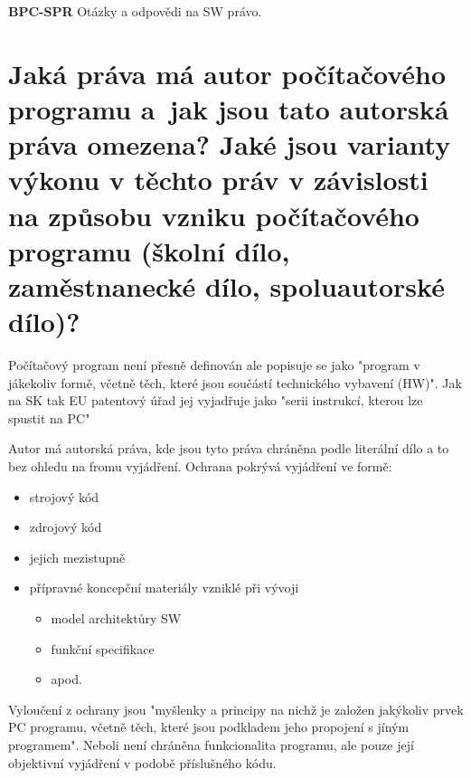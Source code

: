 \documentclass[12pt,a4paper,czech]{article}
\let\LaTeXStandardTableOfContents\tableofcontents
\renewcommand{\tableofcontents}{%
\begingroup%
\renewcommand{\bfseries}{\relax}%
\LaTeXStandardTableOfContents%
\endgroup%
}%
\newcommand{\nadpis}[1]{{\section{#1}}}
\newcommand{\nadpisM}[1]{\noindent\textbf{\Huge{#1}}\normalsize}
\begin{document}
\clearpage
\vspace*{\fill}
\begin{center}
\begin{minipage}{.6\textwidth}
\begin{center}
\vspace{0.5cm} \nadpisM{BPC-SPR}\newline
\newline
Otázky a odpovědi na SW právo.
\end{center}
\end{minipage}
\end{center}
\vfill %
\clearpage



\newpage
\tableofcontents
\newpage

\vspace{0.5cm} 
\nadpis{Jaká práva má autor počítačového programu a~jak jsou tato autorská práva omezena? Jaké jsou varianty výkonu v těchto práv v závislosti na způsobu vzniku počítačového programu (školní dílo, zaměstnanecké dílo, spoluautorské dílo)?}
Počítačový program není přesně definován ale popisuje se jako "program v jákekoliv formě, včetně těch, které jsou součástí technického vybavení (HW)". Jak na SK tak EU patentový úřad jej vyjadřuje jako "serii instrukcí, kterou lze spustit na PC"

Autor má autorská práva, kde jsou tyto práva chráněna podle literální dílo a to bez ohledu na fromu vyjádření.
\newline
\newline
Ochrana pokrývá vyjádření ve formě:
\begin{itemize}
    \setlength\itemsep{0em}
    \item strojový kód
    \item zdrojový kód
    \item jejich mezistupně
    \item přípravné koncepční materiály vzniklé při vývoji
    \begin{itemize}
        \setlength\itemsep{0em}
        \item model architektůry SW
        \item funkční specifikace
        \item apod.
    \end{itemize}
\end{itemize}
Vyloučení z ochrany jsou "myšlenky a principy na nichž je založen jakýkoliv prvek PC programu, včetně těch, které jsou podkladem jeho propojení s jíným programem". Neboli není chráněna funkcionalita programu, ale pouze její objektivní vyjádření v podobě příslušného kódu.
\end{document}
